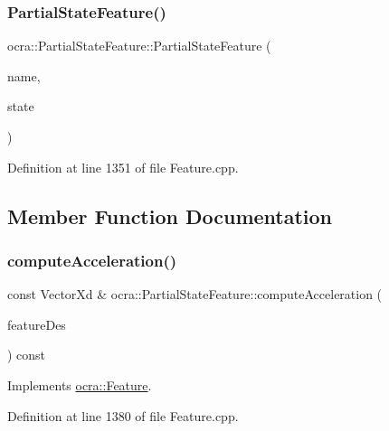 \subsubsection{\texorpdfstring{Partial\+State\+Feature()}{PartialStateFeature()}}
{\footnotesize\ttfamily ocra\+::\+Partial\+State\+Feature\+::\+Partial\+State\+Feature (\begin{DoxyParamCaption}\item[{const std\+::string \&}]{name,  }\item[{Partial\+State\+::\+Ptr}]{state }\end{DoxyParamCaption})}



Definition at line 1351 of file Feature.\+cpp.



\subsection{Member Function Documentation}
\hypertarget{classocra_1_1PartialStateFeature_a42af1ac22fc5d9832e134f507a77bfad}{}\label{classocra_1_1PartialStateFeature_a42af1ac22fc5d9832e134f507a77bfad} 
\subsubsection{\texorpdfstring{compute\+Acceleration()}{computeAcceleration()}\hspace{0.1cm}{\footnotesize\ttfamily [1/2]}}
{\footnotesize\ttfamily const Vector\+Xd \& ocra\+::\+Partial\+State\+Feature\+::compute\+Acceleration (\begin{DoxyParamCaption}\item[{const \hyperlink{classocra_1_1Feature}{Feature} \&}]{feature\+Des }\end{DoxyParamCaption}) const\hspace{0.3cm}{\ttfamily [virtual]}}



Implements \hyperlink{classocra_1_1Feature_a4a5973d27459d2dececec8dc73038df8}{ocra\+::\+Feature}.



Definition at line 1380 of file Feature.\+cpp.

\hypertarget{classocra_1_1PartialStateFeature_a7ed5a87165deed25a91f073e348c53a3}{}\label{classocra_1_1PartialStateFeature_a7ed5a87165deed25a91f073e348c53a3} 
